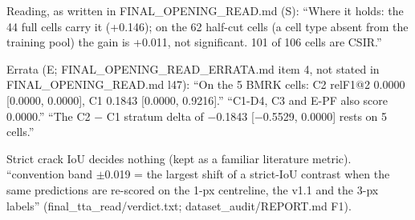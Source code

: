 \begin{table}[htbp]
\begin{minipage}{\linewidth}\scriptsize\raggedright
Reading, as written in FINAL\_\allowbreak{}OPENING\_\allowbreak{}READ.md (S): ``Where it holds: the 44 full cells carry it (+0.146); on the 62 half-cut cells (a cell type absent from the training pool) the gain is +0.011, not significant. 101 of 106 cells are CSIR.''\par
Errata (E; FINAL\_\allowbreak{}OPENING\_\allowbreak{}READ\_\allowbreak{}ERRATA.md item 4, not stated in FINAL\_\allowbreak{}OPENING\_\allowbreak{}READ.md l47): ``On the 5 BMRK cells: C2 relF1@2 0.0000 [0.0000, 0.0000], C1 0.1843 [0.0000, 0.9216].'' ``C1-D4, C3 and E-PF also score 0.0000.'' ``The C2 $-$ C1 stratum delta of $-$0.1843 [$-$0.5529, 0.0000] rests on 5 cells.''\par
Strict crack IoU decides nothing (kept as a familiar literature metric). ``convention band $\pm$0.019 = the largest shift of a strict-IoU contrast when the same predictions are re-scored on the 1-px centreline, the v1.1 and the 3-px labels'' (final\_\allowbreak{}tta\_\allowbreak{}read/\allowbreak{}verdict.txt; dataset\_\allowbreak{}audit/\allowbreak{}REPORT.md F1).\par
\end{minipage}
\end{table}

